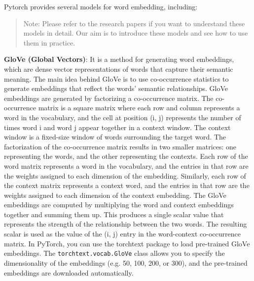 Pytorch provides several models for word embedding, including:

\begin{quote}
Note: Please refer to the research papers if you want to understand these models in detail. Our aim is to introduce these models and see how to use them in practice.

\end{quote}

\textbf{GloVe (Global Vectors)}: It is a method for generating word embeddings, which are dense vector representations of words that capture their semantic meaning. The main idea behind GloVe is to use co-occurrence statistics to generate embeddings that reflect the words' semantic relationships. GloVe embeddings are generated by factorizing a co-occurrence matrix. The co-occurrence matrix is a square matrix where each row and column represents a word in the vocabulary, and the cell at position (i, j) represents the number of times word i and word j appear together in a context window. The context window is a fixed-size window of words surrounding the target word. The factorization of the co-occurrence matrix results in two smaller matrices: one representing the words, and the other representing the contexts. Each row of the word matrix represents a word in the vocabulary, and the entries in that row are the weights assigned to each dimension of the embedding. Similarly, each row of the context matrix represents a context word, and the entries in that row are the weights assigned to each dimension of the context embedding. The GloVe embeddings are computed by multiplying the word and context embeddings together and summing them up. This produces a single scalar value that represents the strength of the relationship between the two words. The resulting scalar is used as the value of the (i, j) entry in the word-context co-occurrence matrix. In PyTorch, you can use the torchtext package to load pre-trained GloVe embeddings. The \verb|torchtext.vocab.GloVe| class allows you to specify the dimensionality of the embeddings (e.g. 50, 100, 200, or 300), and the pre-trained embeddings are downloaded automatically. \newline

